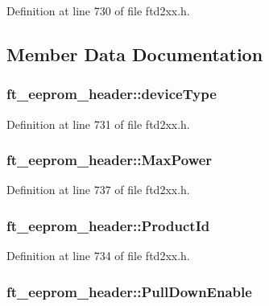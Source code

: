 Definition at line 730 of file ftd2xx.h.

\subsection{Member Data Documentation}
\hypertarget{structft__eeprom__header_a3b27d86c243b51e47e6c279f0ef56251}{
\subsubsection[{deviceType}]{ {\bf ft\_\-eeprom\_\-header::deviceType}}}
\label{structft__eeprom__header_a3b27d86c243b51e47e6c279f0ef56251}


Definition at line 731 of file ftd2xx.h.\hypertarget{structft__eeprom__header_a28ce835ee57a5f21794798f64022d89b}{
\subsubsection[{MaxPower}]{ {\bf ft\_\-eeprom\_\-header::MaxPower}}}
\label{structft__eeprom__header_a28ce835ee57a5f21794798f64022d89b}


Definition at line 737 of file ftd2xx.h.\hypertarget{structft__eeprom__header_a342079ae92d0b71e0e71bde526ded445}{
\subsubsection[{ProductId}]{ {\bf ft\_\-eeprom\_\-header::ProductId}}}
\label{structft__eeprom__header_a342079ae92d0b71e0e71bde526ded445}


Definition at line 734 of file ftd2xx.h.\hypertarget{structft__eeprom__header_a3a9b620423c2d0d1f452269c255f4209}{
\subsubsection[{PullDownEnable}]{ {\bf ft\_\-eeprom\_\-header::PullDownEnable}}}
\label{structft__eeprom__header_a3a9b620423c2d0d1f452269c255f4209}


